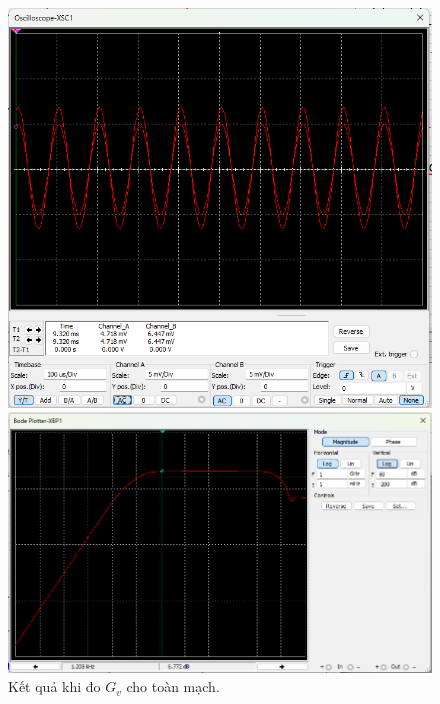 \begin{figure}[H]
	\centering
	\begin{minipage}{.4\linewidth}
		\includegraphics[width=\linewidth]{./my-chapters/my-images/Question5/d_G_V.png}
	\end{minipage}
	\begin{minipage}{.4\linewidth}
		\includegraphics[width=\linewidth]{./my-chapters/my-images/Question5/d_gv_ketqua.png}
	\end{minipage}
	\caption{Kết quả khi đo $G_{v}$ cho toàn mạch.}
\end{figure}